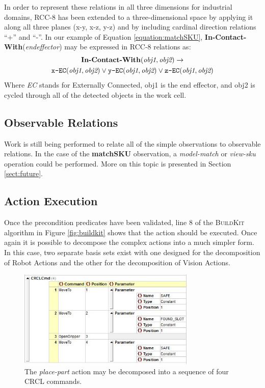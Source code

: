 In order to represent these relations in all three dimensions for 
industrial domains, RCC-8 has been extended to a three-dimensional space 
by applying it along all three planes (x-y, x-z, y-z) and by including 
cardinal direction relations ``+'' and ``-''. In our example of
Equation \ref{equation:matchSKU}, 
\textbf{In-Contact-With}(\textit{endeffector}) may be expressed
in RCC-8 relations as:
\begin{gather}
\textbf{In-Contact-With}(\textit{obj1}, \textit{obj2}) \rightarrow   \notag\\
\texttt{x-EC}(\textit{obj1}, \textit{obj2}) \vee \texttt{y-EC}(\textit{obj1}, \textit{obj2}) \vee \texttt{z-EC}(\textit{obj1},\textit{obj2}) \notag
\end{gather} 
Where \textit{EC} stands for Externally Connected, obj1 is the end effector, and obj2 is 
cycled through all of the detected objects in the work cell. 
\subsection{Observable Relations}
Work is still being performed to relate all of the simple observations to observable relations. In the case of the \textbf{matchSKU} observation, a \textit{model-match} or \textit{view-sku} operation could be performed. More on this topic is presented in Section \ref{sect:future}.
\subsection{Action Execution}
Once the precondition predicates have been validated, line 8 of the \textsc{BuildKit}
algorithm in Figure \ref{fig:buildkit} shows that the action should be executed. Once
again it is possible to decompose the complex actions into a much simpler form. 
In this case, two separate basis sets exist with one designed for the decomposition 
of Robot Actions and the other for the decomposition of Vision Actions.
%
\begin{figure}[htb!]
\begin{center}
\includegraphics[width=8.5cm]{images/PlacePartCRCL.jpg}
\caption{The \textit{place-part} action may be decomposed into a sequence of
four CRCL commands.} 
\label{fig:PlacePartCRCL}
\end{center}
\end{figure}
%

